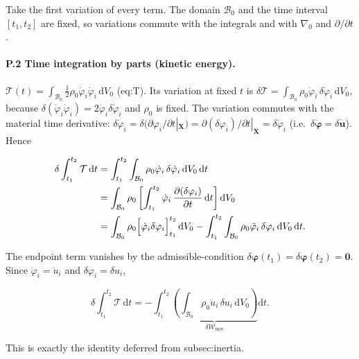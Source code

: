 \documentclass[11pt]{article}
\begin{document}
Take the first variation of every term. The domain $\mathcal{B}_0$ and the time interval $[t_1,t_2]$ are fixed, so variations commute with the integrals and with $\nabla_0$ and $\partial/\partial t$.

\paragraph{P.2 Time integration by parts (kinetic energy).}

$\mathcal{T}(t)=\int_{\mathcal{B}_0}\tfrac12\rho_0\dot{\varphi}_i\dot{\varphi}_i\,\mathrm{d}V_0$ (eq:T). Its variation at fixed $t$ is
$\delta\mathcal{T}=\int_{\mathcal{B}_0}\rho_0\dot{\varphi}_i\,\delta\dot{\varphi}_i\,\mathrm{d}V_0$,
because $\delta(\dot{\varphi}_i\dot{\varphi}_i)=2\dot{\varphi}_i\delta\dot{\varphi}_i$ and $\rho_0$ is fixed. The variation commutes with the material time derivative:
$\delta\dot{\varphi}_i=\delta(\partial\varphi_i/\partial t|_{\mathbf{X}})=\partial(\delta\varphi_i)/\partial t|_{\mathbf{X}}=\delta\dot{\varphi}_i$ (i.e.\ $\delta\dot{\boldsymbol{\varphi}}=\delta\dot{\mathbf{u}}$). Hence

\begin{align}
\delta\int_{t_1}^{t_2}\mathcal{T}\,\mathrm{d}t
&= \int_{t_1}^{t_2}\int_{\mathcal{B}_0}\rho_0\dot{\varphi}_i\,\delta\dot{\varphi}_i\,\mathrm{d}V_0\,\mathrm{d}t \notag\\
&= \int_{\mathcal{B}_0}\rho_0\left[\int_{t_1}^{t_2}\dot{\varphi}_i\,\frac{\partial(\delta\varphi_i)}{\partial t}\,\mathrm{d}t\right]\mathrm{d}V_0 \notag\\
&= \int_{\mathcal{B}_0}\rho_0\Bigl[\dot{\varphi}_i\delta\varphi_i\Bigr]_{t_1}^{t_2}\,\mathrm{d}V_0
 - \int_{t_1}^{t_2}\int_{\mathcal{B}_0}\rho_0\ddot{\varphi}_i\,\delta\varphi_i\,\mathrm{d}V_0\,\mathrm{d}t.
\label{rn2:timeibp}
\end{align}

The endpoint term vanishes by the admissible-condition $\delta\boldsymbol{\varphi}(t_1)=\delta\boldsymbol{\varphi}(t_2)=\mathbf{0}$. Since $\ddot{\varphi}_i=\ddot{u}_i$ and $\delta\varphi_i=\delta u_i$,

\begin{equation}
\delta\int_{t_1}^{t_2}\mathcal{T}\,\mathrm{d}t
= -\int_{t_1}^{t_2}\underbrace{\left(\int_{\mathcal{B}_0}\rho_0\ddot{u}_i\,\delta u_i\,\mathrm{d}V_0\right)}_{\displaystyle\delta\mathcal{W}_{\mathrm{iner}}}\mathrm{d}t.
\label{rn2:timeibp2}
\end{equation}

This is exactly the identity deferred from subsec:inertia. \checkmark
\end{document}
